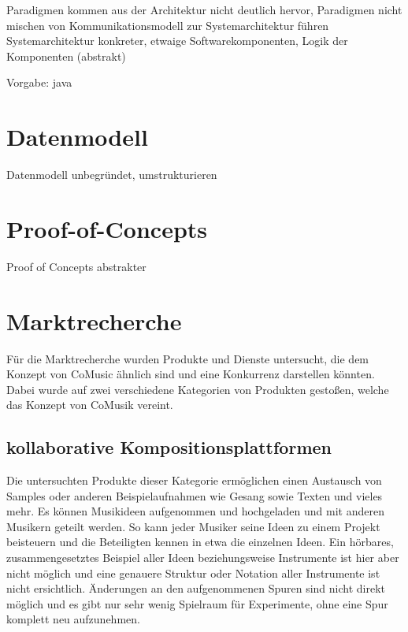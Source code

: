 \documentclass[12pt]{scrartcl}
\begin{document}
Paradigmen kommen aus der Architektur nicht deutlich hervor, Paradigmen nicht mischen
von Kommunikationsmodell zur Systemarchitektur führen
Systemarchitektur konkreter, etwaige Softwarekomponenten, Logik der Komponenten (abstrakt)

Vorgabe: java


\section{Datenmodell}

Datenmodell unbegründet, umstrukturieren


\section{Proof-of-Concepts}

Proof of Concepts abstrakter


\section{Marktrecherche}


Für die Marktrecherche wurden Produkte und Dienste untersucht, die dem Konzept von CoMusic ähnlich sind und eine Konkurrenz darstellen könnten. Dabei wurde auf zwei verschiedene Kategorien von Produkten gestoßen, welche das Konzept von CoMusik vereint.

\subsection{kollaborative Kompositionsplattformen}

Die untersuchten Produkte dieser Kategorie ermöglichen einen Austausch von Samples oder anderen Beispielaufnahmen wie Gesang sowie Texten und vieles mehr. Es können Musikideen aufgenommen und hochgeladen und mit anderen Musikern geteilt werden. So kann jeder Musiker seine Ideen zu einem Projekt beisteuern und die Beteiligten kennen in etwa die einzelnen Ideen. Ein hörbares, zusammengesetztes Beispiel aller Ideen beziehungsweise Instrumente ist hier aber nicht möglich und eine genauere Struktur oder Notation aller Instrumente ist nicht ersichtlich. Änderungen an den aufgenommenen Spuren sind nicht direkt möglich und es gibt nur sehr wenig Spielraum für Experimente, ohne eine Spur komplett neu aufzunehmen.
\end{document}
